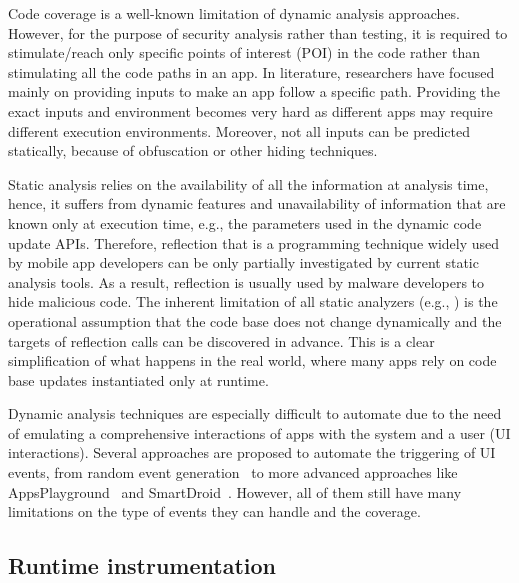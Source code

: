 Code coverage is a well-known limitation of dynamic analysis approaches. However, for the purpose of security analysis rather than testing, it is required to stimulate/reach only specific points of interest (POI) in the code rather than stimulating all the code paths in an app. In literature, researchers have focused mainly on providing inputs to make an app follow a specific path. Providing the exact inputs and environment becomes very hard as different apps may require different execution environments. Moreover, not all inputs can be predicted statically, because of obfuscation or other hiding techniques.

Static analysis relies on the availability of all the information at analysis time, hence, it suffers  from dynamic features and unavailability of information that are known only at execution time, e.g., the parameters used in the dynamic code update APIs. Therefore, reflection that is a programming technique widely used by mobile app developers can be only partially investigated by current  static analysis tools. As a result, reflection is usually used by malware developers to hide malicious code. The inherent limitation of  all static analyzers  (e.g., \cite{FlowDroid_Arzt2014,Saaf_Hoffmann2013}) is the operational assumption  that the code base does not change dynamically and the targets of reflection calls can be discovered in advance. This is a clear simplification of what happens in the real world, where many apps rely on code base updates instantiated only at runtime.

Dynamic analysis techniques are especially difficult to automate due to the need of emulating a comprehensive interactions of apps with the system and a user (UI interactions). Several approaches are proposed to automate the triggering of UI events, from random event generation~\cite{Hu-AST-2011} to more advanced approaches like AppsPlayground~\cite{AppsPlayground_Rastogi2013} and SmartDroid~\cite{SmartDroid_Zheng2012}. However, all of them still have many limitations on the type of events they can handle and the coverage.

\subsection{Runtime instrumentation}



